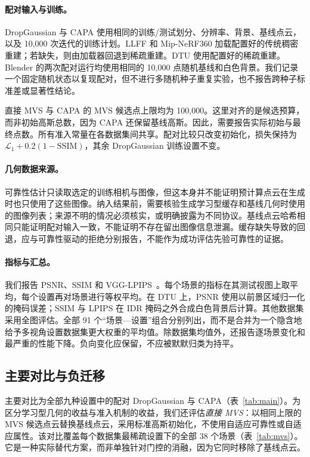 \documentclass{article}
\newcommand{\ours}{CAPA}
\begin{document}
\paragraph{配对输入与训练。}
DropGaussian 与 \ours{} 使用相同的训练/测试划分、分辨率、背景、基线点云，以及 10,000 次迭代的训练计划。LLFF 和 Mip-NeRF360 加载配置好的传统稠密重建；若缺失，则由加载器回退到稀疏重建。DTU 使用配置好的稀疏重建。Blender 的两次配对运行均使用相同的 10,000 点随机基线和白色背景。我们记录一个固定随机状态以复现配对，但不进行多随机种子重复实验，也不报告跨种子标准差或显著性结论。

直接 MVS 与 \ours{} 的 MVS 候选点上限均为 100,000。这里对齐的是候选预算，而非初始高斯总数，因为 \ours{} 还保留基线高斯。因此，需要报告实际初始与最终点数。所有准入常量在各数据集间共享。配对比较只改变初始化，损失保持为 $\mathcal L_1+0.2(1-\mathrm{SSIM})$，其余 DropGaussian 训练设置不变。

\paragraph{几何数据来源。}
可靠性估计只读取选定的训练相机与图像，但这本身并不能证明预计算点云在生成时也只使用了这些图像。纳入结果前，需要核验生成学习型缓存和基线几何时使用的图像列表；来源不明的情况必须核实，或明确披露为不同协议。基线点云哈希相同只能证明配对输入一致，不能证明不存在留出图像信息泄漏。缓存缺失导致的回退，应与可靠性驱动的拒绝分别报告，不能作为成功评估先验可靠性的证据。

\paragraph{指标与汇总。}
我们报告 PSNR、SSIM 和 VGG-LPIPS~\citep{wang2004ssim,zhang2018lpips}。每个场景的指标在其测试视图上取平均，每个设置再对场景进行等权平均。在 DTU 上，PSNR 使用以前景区域归一化的掩码误差；SSIM 与 LPIPS 在 IDR 掩码之外合成白色背景后计算。其他数据集采用全图评估。全部 91 个“场景—设置”组合分别列出，而不是合并为一个隐含地给予多视角设置数据集更大权重的平均值。除数据集均值外，还报告逐场景变化和最严重的性能下降。负向变化应保留，不应被默默归类为持平。

\subsection{主要对比与负迁移}
\label{sec:main-results}

主要对比为全部九种设置中的配对 DropGaussian 与 \ours{}（表~\ref{tab:main}）。为区分学习型几何的收益与准入机制的收益，我们还评估\emph{直接 MVS}：以相同上限的 MVS 候选点云替换基线点云，采用标准高斯初始化，不使用自适应可靠性或自适应属性。该对比覆盖每个数据集最稀疏设置下的全部 38 个场景（表~\ref{tab:mvs}）。它是一种实际替代方案，而非单独针对门控的消融，因为它同时移除了基线点云。
\end{document}
